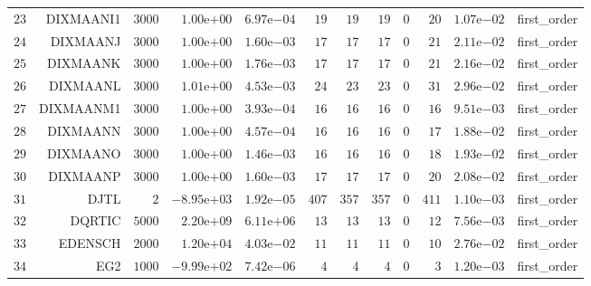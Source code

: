 \begin{longtable}{rrrrrrrrrrrr}
  \(    23\) & DIXMAANI1 & \(  3000\) & \( 1.00\)e\(+00\) & \( 6.97\)e\(-04\) & \(    19\) & \(    19\) & \(    19\) & \(     0\) & \(    20\) & \( 1.07\)e\(-02\) & first\_order \\
  \(    24\) & DIXMAANJ & \(  3000\) & \( 1.00\)e\(+00\) & \( 1.60\)e\(-03\) & \(    17\) & \(    17\) & \(    17\) & \(     0\) & \(    21\) & \( 2.11\)e\(-02\) & first\_order \\
  \(    25\) & DIXMAANK & \(  3000\) & \( 1.00\)e\(+00\) & \( 1.76\)e\(-03\) & \(    17\) & \(    17\) & \(    17\) & \(     0\) & \(    21\) & \( 2.16\)e\(-02\) & first\_order \\
  \(    26\) & DIXMAANL & \(  3000\) & \( 1.01\)e\(+00\) & \( 4.53\)e\(-03\) & \(    24\) & \(    23\) & \(    23\) & \(     0\) & \(    31\) & \( 2.96\)e\(-02\) & first\_order \\
  \(    27\) & DIXMAANM1 & \(  3000\) & \( 1.00\)e\(+00\) & \( 3.93\)e\(-04\) & \(    16\) & \(    16\) & \(    16\) & \(     0\) & \(    16\) & \( 9.51\)e\(-03\) & first\_order \\
  \(    28\) & DIXMAANN & \(  3000\) & \( 1.00\)e\(+00\) & \( 4.57\)e\(-04\) & \(    16\) & \(    16\) & \(    16\) & \(     0\) & \(    17\) & \( 1.88\)e\(-02\) & first\_order \\
  \(    29\) & DIXMAANO & \(  3000\) & \( 1.00\)e\(+00\) & \( 1.46\)e\(-03\) & \(    16\) & \(    16\) & \(    16\) & \(     0\) & \(    18\) & \( 1.93\)e\(-02\) & first\_order \\
  \(    30\) & DIXMAANP & \(  3000\) & \( 1.00\)e\(+00\) & \( 1.60\)e\(-03\) & \(    17\) & \(    17\) & \(    17\) & \(     0\) & \(    20\) & \( 2.08\)e\(-02\) & first\_order \\
  \(    31\) & DJTL & \(     2\) & \(-8.95\)e\(+03\) & \( 1.92\)e\(-05\) & \(   407\) & \(   357\) & \(   357\) & \(     0\) & \(   411\) & \( 1.10\)e\(-03\) & first\_order \\
  \(    32\) & DQRTIC & \(  5000\) & \( 2.20\)e\(+09\) & \( 6.11\)e\(+06\) & \(    13\) & \(    13\) & \(    13\) & \(     0\) & \(    12\) & \( 7.56\)e\(-03\) & first\_order \\
  \(    33\) & EDENSCH & \(  2000\) & \( 1.20\)e\(+04\) & \( 4.03\)e\(-02\) & \(    11\) & \(    11\) & \(    11\) & \(     0\) & \(    10\) & \( 2.76\)e\(-02\) & first\_order \\
  \(    34\) & EG2 & \(  1000\) & \(-9.99\)e\(+02\) & \( 7.42\)e\(-06\) & \(     4\) & \(     4\) & \(     4\) & \(     0\) & \(     3\) & \( 1.20\)e\(-03\) & first\_order \\

\end{longtable}
